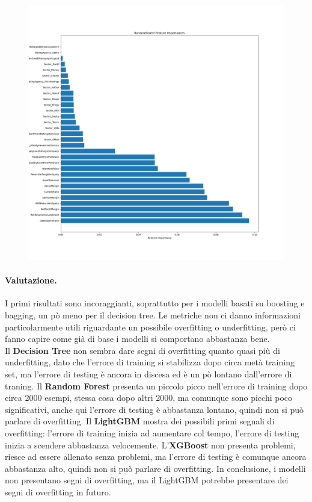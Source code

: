 \begin{figure}[H]
    \centering
    \includegraphics[scale=0.35]{img/feature_importances_RandomForest.png}
\end{figure}

\paragraph{Valutazione.} I primi risultati sono incoraggianti, soprattutto per i modelli basati su boosting e bagging, un pò meno per il decision tree. Le metriche non ci danno informazioni particolarmente utili riguardante un possibile overfitting o underfitting, però ci fanno capire come già di base i modelli si comportano abbastanza bene. \\
Il \textbf{Decision Tree} non sembra dare segni di overfitting quanto quasi più di underfitting, dato che l'errore di training si stabilizza dopo circa metà training set, ma l'errore di testing è ancora in discesa ed è un pò lontano dall'errore di traning. Il \textbf{Random Forest} presenta un piccolo picco nell'errore di training dopo circa 2000 esempi, stessa cosa dopo altri 2000, ma comunque sono picchi poco significativi, anche qui l'errore di testing è abbastanza lontano, quindi non si può parlare di overfitting. Il \textbf{LightGBM} mostra dei possibili primi segnali di overfitting: l'errore di training inizia ad aumentare col tempo, l'errore di testing inizia a scendere abbastanza velocemente. L'\textbf{XGBoost} non presenta problemi, riesce ad essere allenato senza problemi, ma l'errore di testing è comunque ancora abbastanza alto, quindi non si può parlare di overfitting. In conclusione, i modelli non presentano segni di overfitting, ma il LightGBM potrebbe presentare dei segni di overfitting in futuro.



